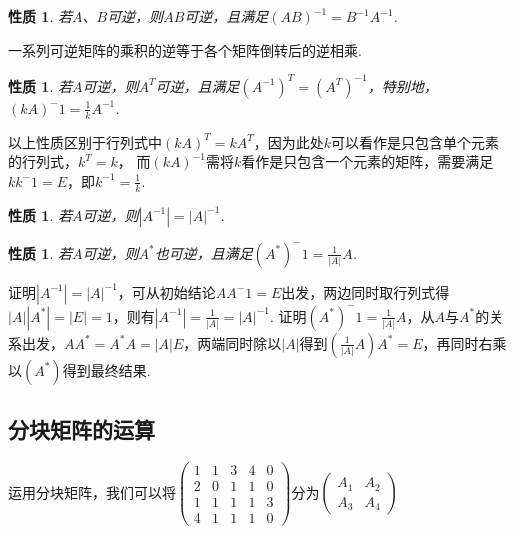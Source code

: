 \documentclass[12pt, a4paper, oneside]{ctexbook}
\newtheorem{quolity}[theorem]{性质}
\begin{document}
\begin{quolity}
    若$A$、$B$可逆，则$AB$可逆，且满足$(AB)^{-1} = B^{-1}A^{-1}$. 
\end{quolity}

一系列可逆矩阵的乘积的逆等于各个矩阵倒转后的逆相乘. 

\begin{quolity}
    若$A$可逆，则$A^T$可逆，且满足$(A^{-1})^T = (A^T)^{-1}$，特别地，$(kA)^-1 = \frac{1}{k}A^{-1}$. 
\end{quolity}

以上性质区别于行列式中$(kA)^T = kA^T$，因为此处$k$可以看作是只包含单个元素的行列式，$k^T = k$，
而$(kA)^{-1}$需将$k$看作是只包含一个元素的矩阵，需要满足$kk^-1 = E$，即$k^{-1} = \frac{1}{k}$. 

\begin{quolity}
    若$A$可逆，则$\left | A^{-1} \right | = \left | A \right |^{-1}$. 
\end{quolity}

\begin{quolity}
    若$A$可逆，则$A^*$也可逆，且满足$(A^*)^-1 = \frac{1}{\left | A \right |}A$. 
\end{quolity}

证明$\left | A^{-1} \right | = \left | A \right |^{-1}$，可从初始结论$AA^-1 = E$出发，两边同时取行列式得$\left | A \right | \left | A^* \right | = \left | E \right | = 1$，则有$\left | A^{-1} \right | = \frac{1}{\left | A \right |} = \left | A \right |^{-1}$. 
证明$(A^*)^-1 = \frac{1}{\left | A \right |}A$，从$A$与$A^*$的关系出发，$AA^* = A^*A = \left | A \right |E$，两端同时除以$\left | A \right |$得到$(\frac{1}{\left | A \right |}A)A^* = E$，再同时右乘以$(A^*)$得到最终结果. 

\subsection{分块矩阵的运算}

运用分块矩阵，我们可以将$\left ( \begin{array}{cccc|c}
    1 & 1 & 3 & 4 & 0 \\ \hline
    2 & 0 & 1 & 1 & 0 \\
    1 & 1 & 1 & 1 & 3 \\
    4 & 1 & 1 & 1 & 0
\end{array} \right )$分为$\begin{pmatrix}
    A_1 & A_2 \\
    A_3 & A_4
\end{pmatrix}$
\end{document}
